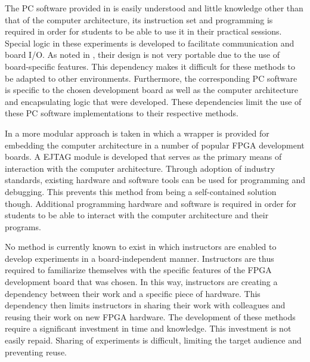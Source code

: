 \documentclass[openright]{template/uva-bachelor-thesis}
\begin{document}
The PC software provided in \cite{holland2003harnessing, bulic2013fpga} is easily understood and little knowledge other than that of the computer architecture, its instruction set and programming is required in order for students to be able to use it in their practical sessions. Special logic in these experiments is developed to facilitate communication and board I/O. As noted in \cite{bulic2013fpga}, their design is not very portable due to the use of board-specific features. This dependency makes it difficult for these methods to be adapted to other environments. Furthermore, the corresponding PC software is specific to the chosen development board as well as the computer architecture and encapsulating logic that were developed. These dependencies limit the use of these PC software implementations to their respective methods. 

In \cite{mipsfpga} a more modular approach is taken in which a wrapper is provided for embedding the computer architecture in a number of popular FPGA development boards. A EJTAG module is developed that serves as the primary means of interaction with the computer architecture. Through adoption of industry standards, existing hardware and software tools can be used for programming and debugging. This prevents this method from being a self-contained solution though. Additional programming hardware and software is required in order for students to be able to interact with the computer architecture and their programs. 

No method is currently known to exist in which instructors are enabled to develop experiments in a board-independent manner. Instructors are thus required to familiarize themselves with the specific features of the FPGA development board that was chosen. In this way, instructors are creating a dependency between their work and a specific piece of hardware. This dependency then limits instructors in sharing their work with colleagues and reusing their work on new FPGA hardware. The development of these methods require a significant investment in time and knowledge.  This investment is not easily repaid. Sharing of experiments is difficult, limiting the target audience and preventing reuse. 


\end{document}
